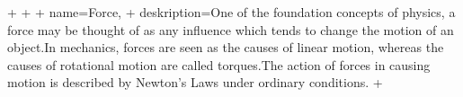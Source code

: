 +
 +  {
 +       name=Force,
 +   deskription={One of the foundation concepts of physics, a force may be thought of as any influence which tends to change the motion of an object.In mechanics, forces are seen as the causes of linear motion, whereas the causes of rotational motion are called torques.The action of forces in causing motion is described by Newton's Laws under ordinary conditions. }
+}

